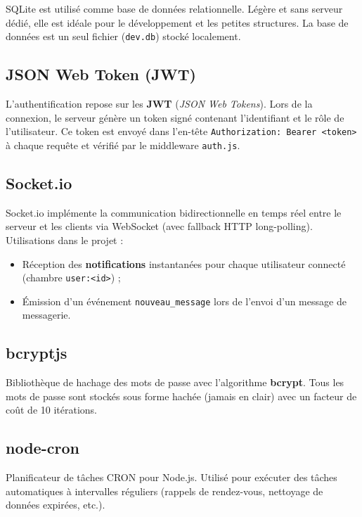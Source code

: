 \documentclass[12pt, a4paper]{report}
\begin{document}
SQLite est utilisé comme base de données relationnelle. Légère et sans serveur
dédié, elle est idéale pour le développement et les petites structures.
La base de données est un seul fichier (\texttt{dev.db}) stocké localement.

\subsection{JSON Web Token (JWT)}

L'authentification repose sur les \textbf{JWT} (\textit{JSON Web Tokens}).
Lors de la connexion, le serveur génère un token signé contenant l'identifiant
et le rôle de l'utilisateur. Ce token est envoyé dans l'en-tête
\texttt{Authorization: Bearer <token>} à chaque requête et vérifié par le
middleware \texttt{auth.js}.

\subsection{Socket.io}

Socket.io implémente la communication bidirectionnelle en temps réel entre
le serveur et les clients via WebSocket (avec fallback HTTP long-polling).
Utilisations dans le projet :

\begin{itemize}
  \item Réception des \textbf{notifications} instantanées pour chaque
        utilisateur connecté (chambre \texttt{user:<id>}) ;
  \item Émission d'un événement \texttt{nouveau\_message} lors de l'envoi
        d'un message de messagerie.
\end{itemize}

\subsection{bcryptjs}

Bibliothèque de hachage des mots de passe avec l'algorithme \textbf{bcrypt}.
Tous les mots de passe sont stockés sous forme hachée (jamais en clair)
avec un facteur de coût de 10 itérations.

\subsection{node-cron}

Planificateur de tâches CRON pour Node.js. Utilisé pour exécuter des tâches
automatiques à intervalles réguliers (rappels de rendez-vous, nettoyage
de données expirées, etc.).
\end{document}
